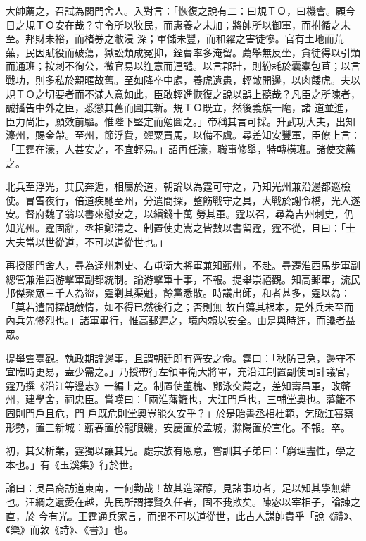 \begin{pinyinscope}
 大帥薦之，召試為閣門舍人。入對言：「恢復之說有二：曰規ＴＯ，曰機會。顧今日之規ＴＯ安在哉？守令所以牧民，而惠養之未加；將帥所以御軍，而拊循之未至。邦財未裕，而楮券之敝浸
 深；軍儲未豐，而和糴之害徒慘。官有土地而荒蕪，民因賦役而破蕩，獄訟類成冤抑，銓曹率多淹留。薦舉無反坐，貪徒得以引類而通班；按刺不徇公，微官易以迕意而連譴。以言郡計，則紛耗於囊橐包苴；以言戰功，則多私於親暱故舊。至如降卒中處，養虎遺患，輕敵開邊，以肉餧虎。夫以規ＴＯ之切要者而不滿人意如此，臣敢輕進恢復之說以誤上聽哉？凡臣之所陳者，誠播告中外之臣，悉懲其舊而圖其新。規ＴＯ既立，然後義旗一麾，諸
 道並進，臣力尚壯，願效前驅。惟陛下堅定而勉圖之。」帝稱其言可採。升武功大夫，出知濠州，賜金帶。至州，節浮費，糴粟買馬，以備不虞。尋差知安豐軍，臣僚上言：「王霆在濠，人甚安之，不宜輕易。」詔再任濠，職事修舉，特轉橫班。諸使交薦之。



 北兵至浮光，其民奔遁，相屬於道，朝論以為霆可守之，乃知光州兼沿邊都巡檢使。冒雪夜行，倍道疾馳至州，分遣間探，整飭戰守之具，大戰於謝令橋，光人遂安。督府魏了翁以書來慰安之，以緡錢十萬
 勞其軍。霆以召，尋為吉州刺史，仍知光州。霆固辭，丞相鄭清之、制置使史嵩之皆數以書留霆，霆不從，且曰：「士大夫當以世從道，不可以道從世也。」



 再授閣門舍人，尋為達州刺史、右屯衛大將軍兼知蘄州，不赴。尋遷淮西馬步軍副總管兼淮西游擊軍副都統制。論游擊軍十事，不報。提舉崇禧觀。知高郵軍，流民邦傑聚眾三千人為盜，霆剿其渠魁，餘黨悉散。時議出師，和者甚多，霆以為：「莫若遣間探覘敵情，如不得已然後行之；否則無
 故自蕩其根本，是外兵未至而內兵先慘烈也。」諸軍畢行，惟高郵遲之，境內賴以安全。由是與時迕，而讒者益眾。



 提舉雲臺觀。執政期論邊事，且謂朝廷即有齊安之命。霆曰：「秋防已急，邊守不宜臨時更易，盍少需之。」乃授帶行左領軍衛大將軍，充沿江制置副使司計議官，霆乃撰《沿江等邊志》一編上之。制置使董槐、鄧泳交薦之，差知壽昌軍，改蘄州，建學舍，祠忠臣。嘗嘆曰：「兩淮藩籬也，大江門戶也，三輔堂奧也。藩籬不固則門戶且危，門
 戶既危則堂奧豈能久安乎？」於是貽書丞相杜範，乞瞰江審察形勢，置三新城：蘄春置於龍眼磯，安慶置於孟城，滁陽置於宣化。不報。卒。



 初，其父析業，霆獨以讓其兄。處宗族有恩意，嘗訓其子弟曰：「窮理盡性，學之本也。」有《玉溪集》行於世。



 論曰：吳昌裔訪道東南，一何勤哉！故其造深醇，見諸事功者，足以知其學無雜也。汪綱之遺愛在越，先民所謂擇賢久任者，固不我欺矣。陳宓以宰相子，論諫之直，於
 今有光。王霆通兵家言，而謂不可以道從世，此古人謀帥貴乎「說《禮》、《樂》而敦《詩》、《書》」也。



\end{pinyinscope}